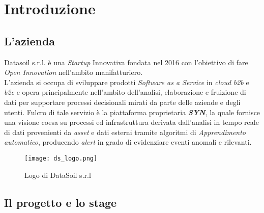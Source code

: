 
\chapter{Introduzione}
\label{cap:introduzione}


\section{L'azienda}

Datasoil s.r.l. è una \textit{Startup} Innovativa fondata nel 2016 con l'obiettivo di fare \textit{Open Innovation} nell'ambito manifatturiero.\\
L'azienda si occupa di sviluppare prodotti \textit{Software as a Service} in \textit{cloud} \textit{\gls{b2b}} e \textit{\gls{b2c}} e opera principalmente nell'ambito dell'analisi, elaborazione e fruizione di dati per supportare processi decisionali mirati da parte delle aziende e degli utenti. Fulcro di tale servizio è la piattaforma proprietaria \textbf{\textit{SYN}}, la quale fornisce una visione coesa su processi ed infrastruttura derivata dall'analisi in tempo reale di dati provenienti da \textit{asset} e dati esterni tramite algoritmi di \textit{\gls{Apprendimento automatico}}, producendo \textit{alert} in grado di evidenziare eventi anomali e rilevanti.

\begin{figure}[!h] 
    \centering 
    \texttt{[image: ds\_logo.png]} 
    \caption{Logo di DataSoil s.r.l}
\end{figure}

\section{Il progetto e lo stage}

